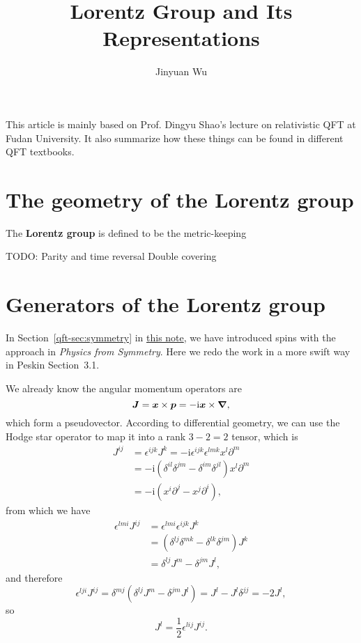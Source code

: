 \documentclass[hyperref, a4paper]{article}
\title{Lorentz Group and Its Representations}
\author{Jinyuan Wu}
\newcommand*{\ii}{\mathrm{i}}
\newcommand*{\concept}[1]{{\textbf{#1}}}
\begin{document}
\maketitle

This article is mainly based on Prof. Dingyu Shao's lecture on relativistic QFT at Fudan University.
It also summarize how these things can be found in different QFT textbooks.

\section{The geometry of the Lorentz group}

The \concept{Lorentz group} is defined to be the metric-keeping   

TODO: Parity and time reversal
Double covering

\section{Generators of the Lorentz group}

In Section~\ref{qft-sec:symmetry} in \href{../relativistic-qft/relativistic-qft.pdf}{this note}, we have 
introduced spins with the approach in \emph{Physics from Symmetry}. Here we redo the work in a more swift 
way in Peskin Section~3.1.

We already know the angular momentum operators are  
\begin{equation}
    \vb*{J} = \vb*{x} \times \vb*{p} = - \ii \vb*{x} \times \grad,
\end{equation}
which form a pseudovector. According to differential geometry, we can use the Hodge star operator to map it 
into a rank $3-2=2$ tensor, which is 
\begin{equation}
    \begin{aligned}
        J^{ij} &= \epsilon^{ijk} J^k = - \ii \epsilon^{ijk} \epsilon^{lmk} x^l \partial^m \\
        &= - \ii (\delta^{il} \delta^{jm} - \delta^{im} \delta^{jl}) x^l \partial^m \\
        &= - \ii (x^i \partial^j - x^j \partial^i),
    \end{aligned}
    \label{eq:jij-def}
\end{equation}
from which we have 
\[
    \begin{aligned}
        \epsilon^{lmi} J^{ij} &= \epsilon^{lmi} \epsilon^{ijk} J^k \\
        &= (\delta^{lj} \delta^{mk} - \delta^{lk} \delta^{jm}) J^k \\
        &= \delta^{lj} J^m - \delta^{jm} J^l,
    \end{aligned}
\]
and therefore 
\[
    \epsilon^{lji} J^{ij} = \delta^{mj} (\delta^{lj} J^m - \delta^{jm} J^l) = J^l - J^l \delta^{jj} = - 2 J^l,
\]
so
\begin{equation}
    J^l = \frac{1}{2} \epsilon^{lij} J^{ij}.    
\end{equation}
\end{document}
